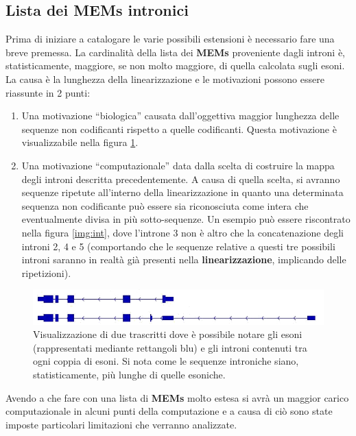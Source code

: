 \documentclass[a4paper,12pt, oneside]{book}
\begin{document}
\subsection{Lista dei MEMs intronici}
Prima di iniziare a catalogare le varie possibili estensioni è necessario fare
una breve premessa. La cardinalità della lista dei \textbf{MEMs} proveniente
dagli introni è, statisticamente, maggiore, se non molto maggiore, di quella
calcolata sugli esoni. La causa è la lunghezza della linearizzazione e le
motivazioni possono essere riassunte in 2 punti: 
\begin{enumerate}
  \item Una motivazione ``biologica'' causata dall'oggettiva maggior lunghezza
  delle sequenze non codificanti rispetto a quelle codificanti. Questa
  motivazione è visualizzabile nella figura \ref{long}.
  \item Una motivazione ``computazionale'' data dalla scelta di costruire la
  mappa degli introni descritta precedentemente. A causa di quella scelta, si
  avranno sequenze ripetute all'interno della linearizzazione in quanto una
  determinata sequenza non codificante può essere sia riconosciuta come intera
  che eventualmente divisa in più sotto-sequenze. Un esempio può essere
  riscontrato nella figura \ref{img:int}, dove l'introne 3 non è altro che la
  concatenazione degli introni 2, 4 e 5 (comportando che le sequenze relative a
  questi tre possibili introni saranno in realtà già presenti nella
  \textbf{linearizzazione}, implicando delle ripetizioni).
\end{enumerate}
\begin{figure}[H]
  \centering
  \includegraphics[scale = 2.75]{img/ivse.jpg}
  \caption{Visualizzazione di due trascritti dove è possibile notare gli esoni
    (rappresentati mediante rettangoli blu) e gli introni contenuti tra ogni
    coppia di esoni. Si nota come le sequenze introniche siano, statisticamente,
    più lunghe di quelle esoniche.}
  \label{long}
\end{figure}
Avendo a che fare con una lista di \textbf{MEMs} molto estesa si avrà un maggior
carico computazionale in alcuni punti della computazione e a causa di ciò sono
state imposte particolari limitazioni che verranno analizzate.
\end{document}
